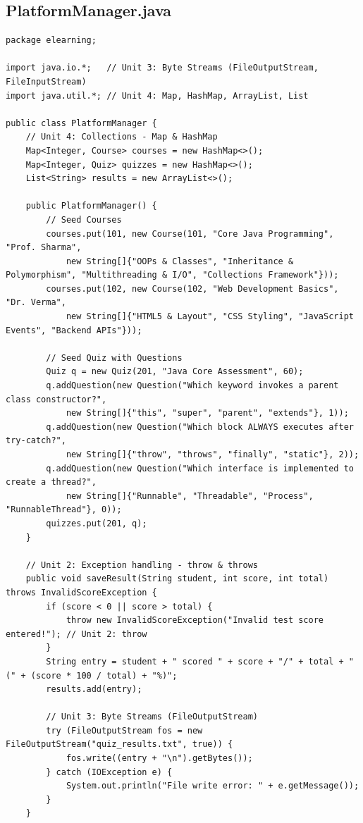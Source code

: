 \documentclass[12pt,a4paper]{article}
\begin{document}
\subsection{PlatformManager.java}
\begin{lstlisting}
package elearning;

import java.io.*;   // Unit 3: Byte Streams (FileOutputStream, FileInputStream)
import java.util.*; // Unit 4: Map, HashMap, ArrayList, List

public class PlatformManager {
    // Unit 4: Collections - Map & HashMap
    Map<Integer, Course> courses = new HashMap<>();
    Map<Integer, Quiz> quizzes = new HashMap<>();
    List<String> results = new ArrayList<>();

    public PlatformManager() {
        // Seed Courses
        courses.put(101, new Course(101, "Core Java Programming", "Prof. Sharma", 
            new String[]{"OOPs & Classes", "Inheritance & Polymorphism", "Multithreading & I/O", "Collections Framework"}));
        courses.put(102, new Course(102, "Web Development Basics", "Dr. Verma", 
            new String[]{"HTML5 & Layout", "CSS Styling", "JavaScript Events", "Backend APIs"}));

        // Seed Quiz with Questions
        Quiz q = new Quiz(201, "Java Core Assessment", 60);
        q.addQuestion(new Question("Which keyword invokes a parent class constructor?", 
            new String[]{"this", "super", "parent", "extends"}, 1));
        q.addQuestion(new Question("Which block ALWAYS executes after try-catch?", 
            new String[]{"throw", "throws", "finally", "static"}, 2));
        q.addQuestion(new Question("Which interface is implemented to create a thread?", 
            new String[]{"Runnable", "Threadable", "Process", "RunnableThread"}, 0));
        quizzes.put(201, q);
    }

    // Unit 2: Exception handling - throw & throws
    public void saveResult(String student, int score, int total) throws InvalidScoreException {
        if (score < 0 || score > total) {
            throw new InvalidScoreException("Invalid test score entered!"); // Unit 2: throw
        }
        String entry = student + " scored " + score + "/" + total + " (" + (score * 100 / total) + "%)";
        results.add(entry);

        // Unit 3: Byte Streams (FileOutputStream)
        try (FileOutputStream fos = new FileOutputStream("quiz_results.txt", true)) {
            fos.write((entry + "\n").getBytes());
        } catch (IOException e) {
            System.out.println("File write error: " + e.getMessage());
        }
    }


\end{lstlisting}
\end{document}
